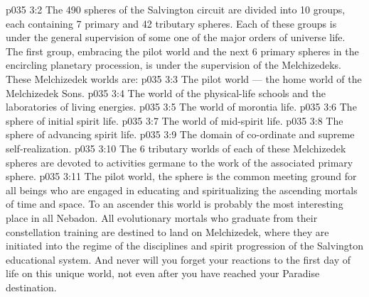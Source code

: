 \vs p035 3:2 The 490 spheres of the Salvington circuit are divided into 10 groups, each containing 7 primary and 42 tributary spheres. Each of these groups is under the general supervision of some one of the major orders of universe life. The first group, embracing the pilot world and the next 6 primary spheres in the encircling planetary procession, is under the supervision of the Melchizedeks. These Melchizedek worlds are:
\vs p035 3:3 \bibnobreakspace The pilot world --- the home world of the Melchizedek Sons.
\vs p035 3:4 \bibnobreakspace The world of the physical\hyp{}life schools and the laboratories of living energies.
\vs p035 3:5 \bibnobreakspace The world of morontia life.
\vs p035 3:6 \bibnobreakspace The sphere of initial spirit life.
\vs p035 3:7 \bibnobreakspace The world of mid\hyp{}spirit life.
\vs p035 3:8 \bibnobreakspace The sphere of advancing spirit life.
\vs p035 3:9 \bibnobreakspace The domain of co\hyp{}ordinate and supreme self\hyp{}realization.
\vs p035 3:10 \pc The 6 tributary worlds of each of these Melchizedek spheres are devoted to activities germane to the work of the associated primary sphere.
\vs p035 3:11 \pc The pilot world, the sphere  is the common meeting ground for all beings who are engaged in educating and spiritualizing the ascending mortals of time and space. To an ascender this world is probably the most interesting place in all Nebadon. All evolutionary mortals who graduate from their constellation training are destined to land on Melchizedek, where they are initiated into the regime of the disciplines and spirit progression of the Salvington educational system. And never will you forget your reactions to the first day of life on this unique world, not even after you have reached your Paradise destination.
